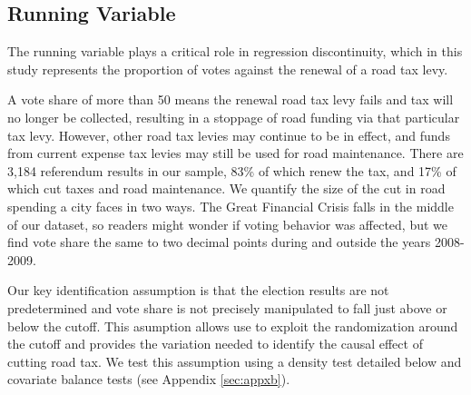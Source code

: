 










\subsection{Running Variable}

The running variable plays a critical role in regression discontinuity, which in this study represents the proportion of votes against the renewal of a road tax levy. 

A vote share of more than 50 means the renewal road tax levy fails and tax will no longer be collected, resulting in a stoppage of road funding via that particular tax levy. However, other road tax levies may continue to be in effect, and funds from current expense tax levies may still be used for road maintenance. There are 3,184 referendum results in our sample, 83\% of which renew the tax, and 17\% of which cut taxes and road maintenance. We quantify the size of the cut in road spending a city faces in two ways. The Great Financial Crisis falls in the middle of our dataset, so readers might wonder if voting behavior was affected, but we find vote share the same to two decimal points during and outside the years 2008-2009. 

Our key identification assumption is that the election results are not predetermined and vote share is not precisely manipulated to fall just above or below the cutoff. This asumption allows use to exploit the randomization around the cutoff and provides the variation needed to identify the causal effect of cutting road tax. We test this assumption using a density test detailed below and covariate balance tests (see Appendix \ref{sec:appxb}).

